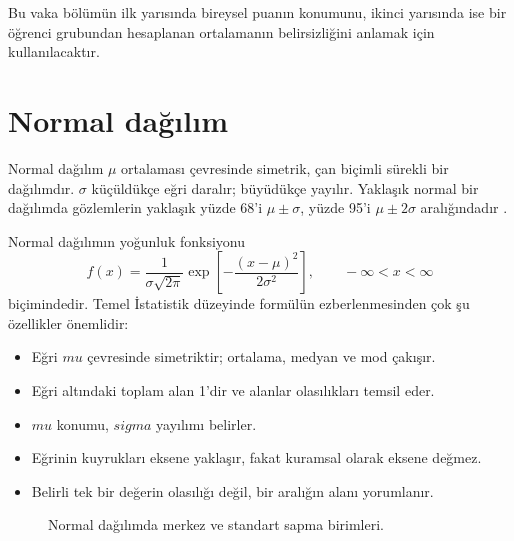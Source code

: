 Bu vaka bölümün ilk yarısında bireysel puanın konumunu, ikinci yarısında ise
bir öğrenci grubundan hesaplanan ortalamanın belirsizliğini anlamak için
kullanılacaktır.

\section{Normal dağılım}

Normal dağılım $\mu$ ortalaması çevresinde simetrik, çan biçimli sürekli bir
dağılımdır. $\sigma$ küçüldükçe eğri daralır; büyüdükçe yayılır. Yaklaşık
normal bir dağılımda gözlemlerin yaklaşık yüzde 68'i $\mu\pm\sigma$, yüzde
95'i $\mu\pm2\sigma$ aralığındadır \cite{degroot2012,hogg2019}.

Normal dağılımın yoğunluk fonksiyonu
\[
f(x)=\frac{1}{\sigma\sqrt{2\pi}}
\exp\!\left[-\frac{(x-\mu)^2}{2\sigma^2}\right],
\qquad -\infty<x<\infty
\]
biçimindedir. Temel İstatistik düzeyinde formülün ezberlenmesinden çok şu
özellikler önemlidir:

\begin{itemize}
  \item Eğri $mu$ çevresinde simetriktir; ortalama, medyan ve mod çakışır.
  \item Eğri altındaki toplam alan 1'dir ve alanlar olasılıkları temsil eder.
  \item $mu$ konumu, $sigma$ yayılımı belirler.
  \item Eğrinin kuyrukları eksene yaklaşır, fakat kuramsal olarak eksene değmez.
  \item Belirli tek bir değerin olasılığı değil, bir aralığın alanı yorumlanır.
\end{itemize}

\begin{figure}[htbp]
\centering
{}
\caption{Normal dağılımda merkez ve standart sapma birimleri.}
\end{figure}

